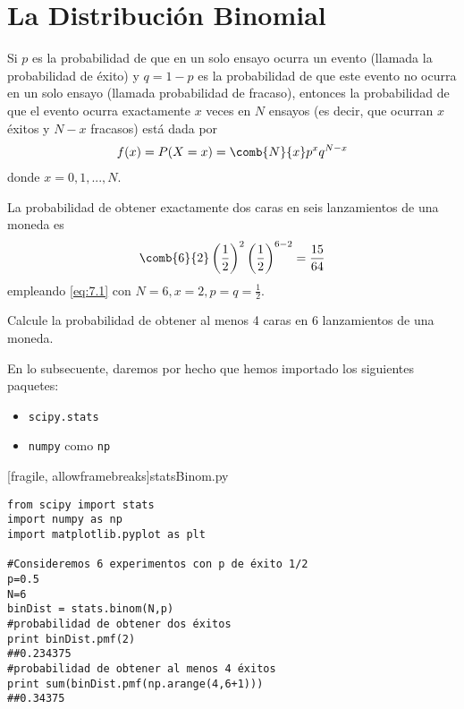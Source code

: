 
\section{La Distribución Binomial}


 Si $p$ es la probabilidad de que en un solo ensayo ocurra un evento (llamada la probabilidad de éxito) y $q = 1 - p$ es la
probabilidad de que este evento no ocurra en un solo ensayo (llamada probabilidad de fracaso), entonces la probabilidad de que el evento ocurra exactamente $x$ veces en $N$ ensayos (es decir, que ocurran $x$ éxitos y $N - x$ fracasos) está
dada por
\begin{align}
 \label{eq:7.1}
 f(x)=P(X=x)=\comb{N}{x}p^{x}q^{N-x}
\end{align}
donde $x=0,1,...,N.$


 \begin{exmp}
  \label{exmp:7.1}
  La probabilidad de obtener exactamente dos caras en seis lanzamientos de una moneda es
  \begin{align*}
   \comb{6}{2}\left( \dfrac{1}{2} \right)^{2}\left( \dfrac{1}{2} \right)^{6-2}=\dfrac{15}{64}
  \end{align*}
empleando \eqref{eq:7.1} con $N=6, x=2, p=q=\frac{1}{2}.$
 \end{exmp}



\begin{exmp}
 \label{exmp:7.2}
 Calcule la probabilidad de obtener al menos 4 caras en 6 lanzamientos de una moneda.
\end{exmp}



 En lo subsecuente, daremos por hecho que hemos importado los siguientes paquetes:
 \begin{itemize}
  \item \texttt{scipy.stats}
  \item \texttt{numpy} como \texttt{np}
 \end{itemize}


[fragile, allowframebreaks]{statsBinom.py}
\begin{verbatim}
from scipy import stats
import numpy as np
import matplotlib.pyplot as plt

#Consideremos 6 experimentos con p de éxito 1/2
p=0.5
N=6
binDist = stats.binom(N,p)
#probabilidad de obtener dos éxitos
print binDist.pmf(2)
##0.234375
#probabilidad de obtener al menos 4 éxitos
print sum(binDist.pmf(np.arange(4,6+1)))
##0.34375
 \end{verbatim}


